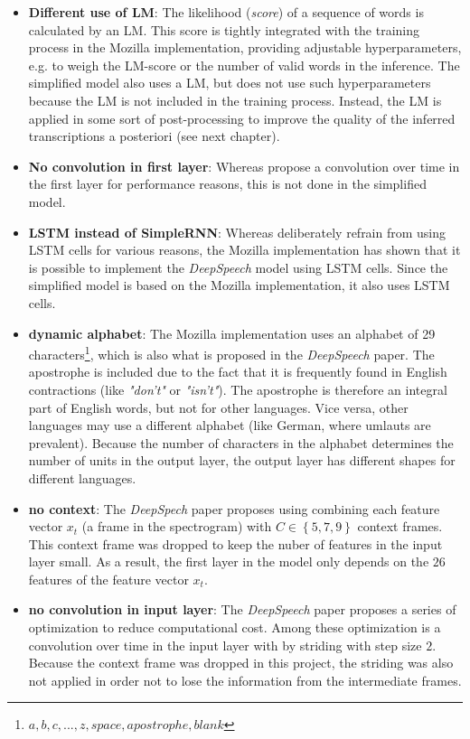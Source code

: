 \begin{itemize}
	\item \textbf{Different use of LM}: The likelihood (\textit{score}) of a sequence of words is calculated by an \ac{LM}. This score is tightly integrated with the training process in the Mozilla implementation, providing adjustable hyperparameters, e.g. to weigh the \ac{LM}-score or the number of valid words in the inference. The simplified model also uses a \ac{LM}, but does not use such hyperparameters because the \ac{LM} is not included in the training process. Instead, the \ac{LM} is applied in some sort of post-processing to improve the quality of the inferred transcriptions a posteriori (see next chapter).
	\item \textbf{No convolution in first layer}: Whereas \cite{ctc_paper} propose a convolution over time in the first layer for performance reasons, this is not done in the simplified model.
	\item \textbf{LSTM instead of SimpleRNN}: Whereas \cite{ctc_paper} deliberately refrain from using \ac{LSTM} cells for various reasons, the Mozilla implementation has shown that it is possible to implement the \textit{DeepSpeech} model using \ac{LSTM} cells. Since the simplified model is based on the Mozilla implementation, it also uses \ac{LSTM} cells.
	\item \textbf{dynamic alphabet}: The Mozilla implementation uses an alphabet of 29 characters\footnote{${a,b,c,...,z, space, apostrophe, blank}$}, which is also what is proposed in the \textit{DeepSpeech} paper. The apostrophe is included due to the fact that it is frequently found in English contractions (like \textit{"don't"} or \textit{"isn't"}). The apostrophe is therefore an integral part of English words, but not for other languages. Vice versa, other languages may use a different alphabet (like German, where umlauts are prevalent). Because the number of characters in the alphabet determines the number of units in the output layer, the output layer has different shapes for different languages.
	\item \textbf{no context}: The \textit{DeepSpech} paper proposes using combining each feature vector $x_t$ (a frame in the spectrogram) with $C \in \left\{ 5,7,9 \right\}$ context frames. This context frame was dropped to keep the nuber of features in the input layer small. As a result, the first layer in the model only depends on the $26$ features of the feature vector $x_t$.
	\item \textbf{no convolution in input layer}: The \textit{DeepSpeech} paper proposes a series of optimization to reduce computational cost. Among these optimization is a convolution over time in the input layer with by striding with step size $2$. Because the context frame was dropped in this project, the striding was also not applied in order not to lose the information from the intermediate frames.
\end{itemize}


